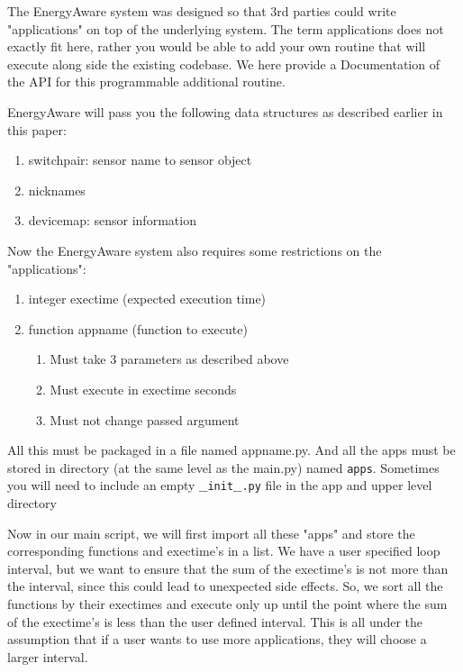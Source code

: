 \documentclass{sig-alternate-05-2015}
\begin{document}
The EnergyAware system was designed so that 3rd parties could write "applications" on top of the underlying system. The term applications does not exactly fit here, rather you would be able to add your own routine that will execute along side the existing codebase. We here provide a Documentation of the API for this programmable additional routine.

EnergyAware will pass you the following data structures as described earlier in this paper:

\begin{enumerate}
	\item switchpair: sensor name to sensor object
	\item nicknames
	\item devicemap: sensor information
\end{enumerate}

Now the EnergyAware system also requires some restrictions on the "applications":
\begin{enumerate}
	\item integer exectime (expected execution time)
	\item function appname (function to execute)
	\begin{enumerate}
		\item Must take 3 parameters as described above
		\item Must execute in exectime seconds
		\item Must not change passed argument
	\end{enumerate}
\end{enumerate}

All this must be packaged in a file named appname.py. And all the apps must be stored in directory (at the same level as the main.py) named \texttt{apps}. Sometimes you will need to include an empty \texttt{$\_\_$init$\_\_$.py} file in the app and upper level directory

Now in our main script, we will first import all these "apps" and store the corresponding functions and exectime's in a list. We have a user specified loop interval, but we want to ensure that the sum of the exectime's is not more than the interval, since this could lead to unexpected side effects. So, we sort all the functions by their exectimes and execute only up until the point where the sum of the exectime's is less than the user defined interval. This is all under the assumption that if a user wants to use more applications, they will choose a larger interval.
\end{document}
